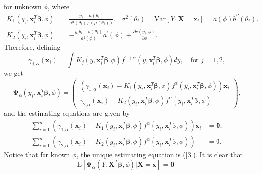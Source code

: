 \documentclass[a4paper]{article}%
\begin{document}
for unknown $\phi$, where
\begin{align*}
K_{1}(y_{i},\boldsymbol{x}_{i}^{T}\boldsymbol{\beta},\phi)  &  =\frac
{y_{i}-\mu(\theta_{i})}{\sigma^{2}(\theta_{i})g^{\prime}\left(  \mu(\theta
_{i})\right)  },
~~~ \sigma^{2}(\theta_{i})    =\mathrm{Var}\left[  Y_{i}|\boldsymbol{X=x}%
_{i}\right]  =a(\phi)b^{\prime\prime}(\theta_{i}),\\
K_{2}(y_{i},\boldsymbol{x}_{i}^{T}\boldsymbol{\beta},\phi)  &  =-\frac
{y_{i}\theta_{i}-b\left(  \theta_{i}\right)  }{a^{2}(\phi)}a^{\prime}%
(\phi)+\frac{\partial c\left(  y_{i},\phi\right)  }{\partial\phi}.
\end{align*}
Therefore, defining
\begin{equation}
\gamma_{j,\alpha}(\boldsymbol{x}_{i})=\int K_{j}(y,\boldsymbol{x}_{i}%
^{T}\boldsymbol{\beta},\phi)f^{1+\alpha}(y,\boldsymbol{x}_{i}^{T}%
\boldsymbol{\beta},\phi)dy,\quad\text{for }j=1,2, \label{gamma}%
\end{equation}
we get
\[
\boldsymbol{\Psi}_{\alpha}(y_{i},\boldsymbol{x}_{i}^{T}\boldsymbol{\beta}%
,\phi)=%
\begin{pmatrix}
\left(  \gamma_{1,\alpha}(\boldsymbol{x}_{i})-K_{1}(y_{i},\boldsymbol{x}%
_{i}^{T}\boldsymbol{\beta},\phi)f^{\alpha}(y_{i},\boldsymbol{x}_{i}%
^{T}\boldsymbol{\beta},\phi)\right)  \boldsymbol{x}_{i}\\
\gamma_{2,\alpha}(\boldsymbol{x}_{i})-K_{2}(y_{i},\boldsymbol{x}_{i}%
^{T}\boldsymbol{\beta},\phi)f^{\alpha}(y_{i},\boldsymbol{x}_{i}^{T}%
\boldsymbol{\beta},\phi)
\end{pmatrix}
,
\]
and the estimating equations are given by
\begin{align}%
{\displaystyle\sum\limits_{i=1}^{n}}
\left(  \gamma_{1,\alpha}(\boldsymbol{x}_{i})-K_{1}(y_{i},\boldsymbol{x}%
_{i}^{T}\boldsymbol{\beta},\phi)f^{\alpha}(y_{i},\boldsymbol{x}_{i}%
^{T}\boldsymbol{\beta},\phi)\right)  \boldsymbol{x}_{i}  &  =\boldsymbol{0}%
,\label{3}\\%
{\displaystyle\sum\limits_{i=1}^{n}}
\left(  \gamma_{2,\alpha}(\boldsymbol{x}_{i})-K_{2}(y_{i},\boldsymbol{x}%
_{i}^{T}\boldsymbol{\beta},\phi)f^{\alpha}(y_{i},\boldsymbol{x}_{i}%
^{T}\boldsymbol{\beta},\phi)\right)   &  =0. \label{4}%
\end{align}
Notice that for known $\phi$, the unique estimating equation is (\ref{3}). It
is clear that
\[
\mathrm{E}\left[  \boldsymbol{\Psi}_{\alpha}(Y,\boldsymbol{X}^{T}%
\boldsymbol{\beta},\phi)|\boldsymbol{X}=\boldsymbol{x}\right]  =\boldsymbol{0}%
,
\]
\end{document}

